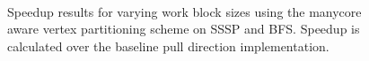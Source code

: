 \begin{figure}[h!]
    \centering
     \\
    \caption{Speedup results for varying work block sizes using the manycore aware vertex partitioning scheme on SSSP and BFS. Speedup is calculated over the baseline pull direction implementation.}
    \label{pap:generals:sec:eval:fig:cache}
\end{figure}


